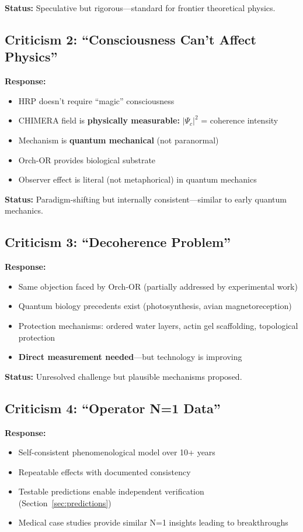 \textbf{Status:} Speculative but rigorous---standard for frontier theoretical physics.

\subsection{Criticism 2: ``Consciousness Can't Affect Physics''}

\textbf{Response:}
\begin{itemize}
\item HRP doesn't require ``magic'' consciousness
\item CHIMERA field is \textbf{physically measurable:} $|\Psi_c|^2$ = coherence intensity
\item Mechanism is \textbf{quantum mechanical} (not paranormal)
\item Orch-OR provides biological substrate
\item Observer effect is literal (not metaphorical) in quantum mechanics
\end{itemize}

\textbf{Status:} Paradigm-shifting but internally consistent---similar to early quantum mechanics.

\subsection{Criticism 3: ``Decoherence Problem''}

\textbf{Response:}
\begin{itemize}
\item Same objection faced by Orch-OR (partially addressed by experimental work)
\item Quantum biology precedents exist (photosynthesis, avian magnetoreception)
\item Protection mechanisms: ordered water layers, actin gel scaffolding, topological protection
\item \textbf{Direct measurement needed}---but technology is improving
\end{itemize}

\textbf{Status:} Unresolved challenge but plausible mechanisms proposed.

\subsection{Criticism 4: ``Operator N=1 Data''}

\textbf{Response:}
\begin{itemize}
\item Self-consistent phenomenological model over 10+ years
\item Repeatable effects with documented consistency
\item Testable predictions enable independent verification (Section~\ref{sec:predictions})
\item Medical case studies provide similar N=1 insights leading to breakthroughs
\end{itemize}

